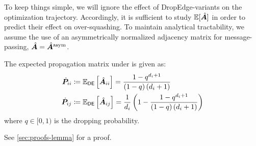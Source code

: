 To keep things simple, we will ignore the effect of DropEdge-variants on the optimization trajectory. Accordingly, it is sufficient to study $\mathbb{E}[\hat{\bm{A}}]$ in order to predict their effect on over-squashing. To maintain analytical tractability, we assume the use of an asymmetrically normalized adjacency matrix for message-passing, $\hat{\bm{A}} = \hat{\bm{A}}^{\text{asym}}$. \\

\begin{lemma}
\label{thm:exp-prop-matrix}
    The expected propagation matrix under  is given as:
    \begin{align}
    \begin{split}
        \dot{\bm{P}}_{ii} &\coloneqq \mathbb{E}_{\mathsf{DE}}\left[\hat{\bm{A}}_{ii}\right] = \frac{1-q^{d_i+1}}{\left(1-q\right)\left(d_i+1\right)} \\
        \dot{\bm{P}}_{ij} &\coloneqq \mathbb{E}_{\mathsf{DE}}\left[\hat{\bm{A}}_{ij}\right] = \frac{1}{d_i}\left(1 - \frac{1-q^{d_i+1}}{\left(1-q\right)\left(d_i+1\right)}\right)
    \end{split} \label{eqn:dropedge}
    \end{align}
    where $q\in[0, 1)$ is the dropping probability. %
\end{lemma}


See \autoref{sec:proofs-lemma} for a proof. 

